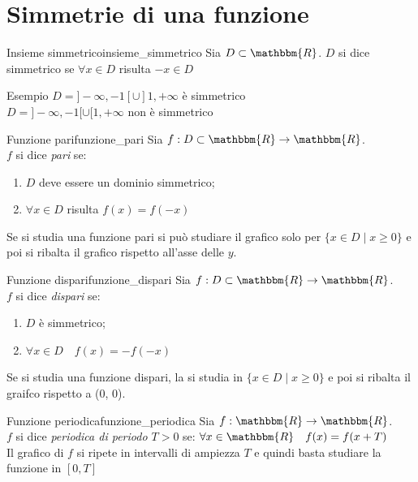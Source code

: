 \documentclass[12pt]{report}
\newcounter{definition}
\begin{document}
	\section{Simmetrie di una funzione}
	\begin{definition}{Insieme simmetrico}{insieme_simmetrico}
		Sia $D \subset \mathbbm{R}$. $D$ si dice simmetrico se $\forall x \in D$ risulta $-x \in D$
	\end{definition}
	\begin{note}{Esempio}{}
		$D = ]-\infty, -1[ \cup ]1, +\infty$ è simmetrico \\
		$D = ]-\infty, -1[ \cup [1, +\infty$ non è simmetrico
	\end{note}
	\begin{definition}{Funzione pari}{funzione_pari}
		Sia $f: D \subset \mathbbm{R} \to \mathbbm{R}$. \\
		$f$ si dice \textit{pari} se:
		\begin{enumerate}
			\item $D$ deve essere un dominio simmetrico;
			\item $\forall x \in D$ risulta $f(x)=f(-x)$
		\end{enumerate}
	\end{definition}
	Se si studia una funzione pari si può studiare il grafico solo per $\{x \in D \mid x \geq 0\}$ e poi si ribalta il grafico rispetto all'asse delle $y$.
	\begin{definition}{Funzione dispari}{funzione_dispari}
		Sia $f: D \subset \mathbbm{R} \to \mathbbm{R}$. \\
		$f$ si dice \textit{dispari} se:
		\begin{enumerate}
			\item $D$ è simmetrico;
			\item $\forall x \in D \quad f(x)=-f(-x)$
		\end{enumerate}
	\end{definition}
	Se si studia una funzione dispari, la si studia in $\{x \in D \mid x \geq 0\}$ e poi si ribalta il graifco rispetto a (0, 0).
	\begin{definition}{Funzione periodica}{funzione_periodica}
		Sia $f: \mathbbm{R} \to \mathbbm{R}$.\\
		$f$ si dice \textit{periodica di periodo $T > 0$} se: $\forall x \in \mathbbm{R} \quad f(x) = f(x + T)$ \\
		Il grafico di $f$ si ripete in intervalli di ampiezza $T$ e quindi basta studiare la funzione in $[0, T]$
	\end{definition}
\end{document}
